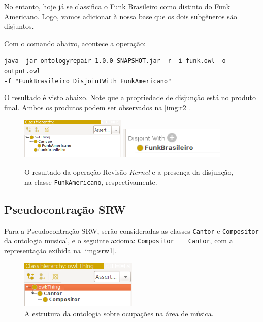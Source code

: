 No entanto, hoje já se classifica o Funk Brasileiro como distinto do Funk Americano. Logo, vamos adicionar à nossa base que os dois subgêneros são disjuntos.

Com o comando abaixo, acontece a operação:

\begin{small}
	\texttt{java -jar ontologyrepair-1.0.0-SNAPSHOT.jar -r -i funk.owl -o output.owl \\ -f "FunkBrasileiro DisjointWith FunkAmericano"}
\end{small}

O resultado é visto abaixo. Note que a propriedade de disjunção está no produto final. Ambos os produtos podem ser observados na \autoref{img:r2}.

\begin{figure}[H]
	\centering
	\includegraphics[width=0.45\textwidth]{Capitulos/Implementacao/r2.png}
	\includegraphics[width=0.45\textwidth]{Capitulos/Implementacao/r3.png}
	\caption{O resultado da operação Revisão \textit{Kernel} e a presença da disjunção, na classe \texttt{FunkAmericano}, respectivamente.}
	\label{img:r2}
\end{figure}

\subsection{Pseudocontração SRW}
\label{sect:srw}

Para a Pseudocontração SRW, serão consideradas as classes \texttt{Cantor} e \texttt{Compositor} da ontologia musical, e o seguinte axioma: \texttt{Compositor} $ \sqsubseteq $ \texttt{Cantor}, com a representação exibida na \autoref{img:srw1}.

\begin{figure}[H]
	\centering
	\includegraphics[width=0.5\textwidth]{Capitulos/Implementacao/srw1.png}
	\caption{A estrutura da ontologia sobre ocupações na área de música.}
	\label{img:srw1}
\end{figure}

